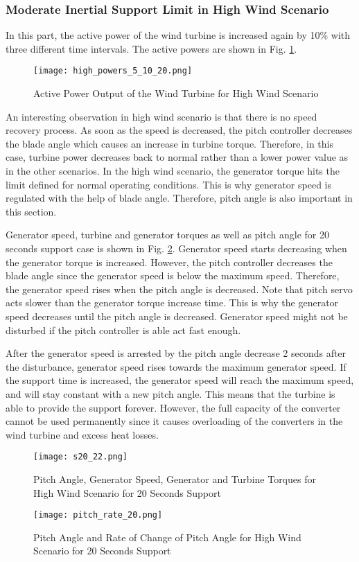 \subsubsection{Moderate Inertial Support Limit in High Wind Scenario}
In this part, the active power of the wind turbine is increased again by 10\% with three different time intervals. The active powers are shown in Fig. \ref{high_powerss}.\par
\begin{figure}[h!]
	\centering
	\texttt{[image: high\_powers\_5\_10\_20.png]}
	\caption{Active Power Output of the Wind Turbine for High Wind Scenario}
	\label{high_powerss}
\end{figure}
An interesting observation in high wind scenario is that there is no speed recovery process. As soon as the speed is decreased, the pitch controller decreases the blade angle which causes an increase in turbine torque. Therefore, in this case, turbine power decreases back to normal rather than a lower power value as in the other scenarios. In the high wind scenario, the generator torque hits the limit defined for normal operating conditions. This is why generator speed is regulated with the help of blade angle. Therefore, pitch angle is also important in this section. \par
Generator speed, turbine and generator torques as well as pitch angle for 20 seconds support case is shown in Fig. \ref{high_s20}. Generator speed starts decreasing when the generator torque is increased. However, the pitch controller decreases the blade angle since the generator speed is below the maximum speed. Therefore, the generator speed rises when the pitch angle is decreased. Note that pitch servo acts slower than the generator torque increase time. This is why the generator speed decreases until the pitch angle is decreased. Generator speed might not be disturbed if the pitch controller is able act fast enough.\par
After the generator speed is arrested by the pitch angle decrease 2 seconds after the disturbance, generator speed rises towards the maximum generator speed. If the support time is increased, the generator speed will reach the maximum speed, and will stay constant with a new pitch angle. This means that the turbine is able to provide the support forever. However, the full capacity of the converter cannot be used permanently since it causes  overloading of the converters in the wind turbine and excess heat losses. 
\begin{figure}[h!]
	\centering
	\texttt{[image: s20\_22.png]}
	\caption{Pitch Angle, Generator Speed, Generator and Turbine Torques for High Wind Scenario for 20 Seconds Support}
	\label{high_s20}
\end{figure}
\begin{figure}[h!]
	\centering
	\texttt{[image: pitch\_rate\_20.png]}
	\caption{Pitch Angle and Rate of Change of Pitch Angle for High Wind Scenario for 20 Seconds Support}
	\label{high_pitch}
\end{figure}
